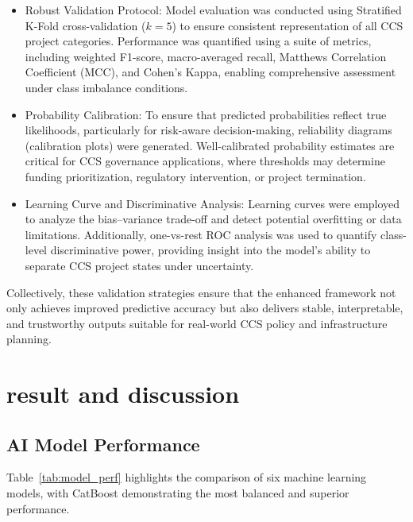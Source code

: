 \documentclass[conference]{IEEEtran}
\begin{document}
\begin{itemize}
    \item Robust Validation Protocol: Model evaluation was conducted using Stratified K-Fold cross-validation ($k = 5$) to ensure consistent representation of all CCS project categories. Performance was quantified using a suite of metrics, including weighted F1-score, macro-averaged recall, Matthews Correlation Coefficient (MCC), and Cohen’s Kappa, enabling comprehensive assessment under class imbalance conditions.

\item Probability Calibration: To ensure that predicted probabilities reflect true likelihoods, particularly for risk-aware decision-making, reliability diagrams (calibration plots) were generated. Well-calibrated probability estimates are critical for CCS governance applications, where thresholds may determine funding prioritization, regulatory intervention, or project termination.

\item Learning Curve and Discriminative Analysis: Learning curves were employed to analyze the bias--variance trade-off and detect potential overfitting or data limitations. Additionally, one-vs-rest ROC analysis was used to quantify class-level discriminative power, providing insight into the model’s ability to separate CCS project states under uncertainty.

\end{itemize}


Collectively, these validation strategies ensure that the enhanced framework not only achieves improved predictive accuracy but also delivers stable, interpretable, and trustworthy outputs suitable for real-world CCS policy and infrastructure planning.

\vspace{-0.1cm}


\section{\textbf{result and discussion}}
\label{result}

\subsection{\textbf{AI Model Performance}}

 Table~\ref{tab:model_perf} highlights the comparison of six machine learning models, with CatBoost demonstrating the most balanced and superior performance. 
 
\end{document}
